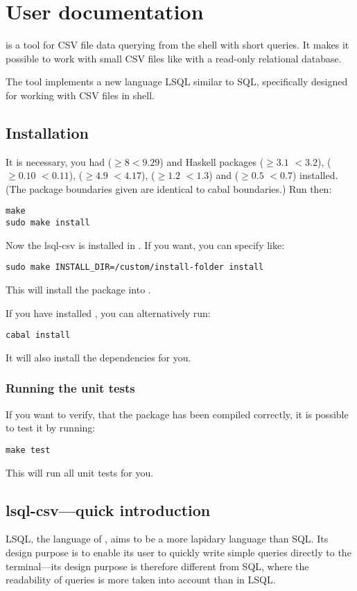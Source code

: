 \chapter{User documentation}
 is a tool for CSV file data querying from the shell with short queries. It makes it possible to work with small CSV files like with a read-only relational database.

The tool implements a new language LSQL similar to SQL, specifically designed for working with CSV files in shell. 

\section{Installation}
It is necessary, you had  ($\geq 8 <9.29$) and Haskell packages  ($\geq 3.1$ $<3.2$),  ($\geq 0.10$ $<0.11$), 
 ($\geq 4.9$ $<4.17$),  ($\geq 1.2$ $<1.3$) and  ($\geq 0.5$ $<0.7$)
 installed. (The package boundaries given are identical to cabal boundaries.) Run then:

\begin{verbatim}
make
sudo make install
\end{verbatim}

Now the lsql-csv is installed in . If you want, you can specify  like:
\begin{verbatim}
sudo make INSTALL_DIR=/custom/install-folder install
\end{verbatim}
This will install the package into .

If you have installed , you can alternatively run:
\begin{verbatim}
cabal install
\end{verbatim}
It will also install the dependencies for you.

\subsection{Running the unit tests}
If you want to verify, that the package has been compiled correctly, it is possible to test it by running:
\begin{verbatim}
make test
\end{verbatim}
This will run all unit tests for you.

\section{lsql-csv---quick introduction}
LSQL, the language of , aims to be a more lapidary language than SQL. Its design purpose is to enable its user to quickly write simple queries directly to the terminal---its design purpose is therefore different from SQL, where the readability of queries is more taken into account than in LSQL.

